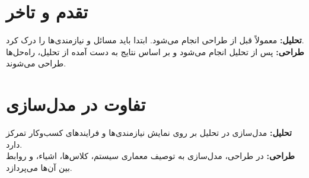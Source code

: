 \section*{تقدم و تاخر}
\textbf{تحلیل:} معمولاً قبل از طراحی انجام می‌شود. ابتدا باید مسائل و نیازمندی‌ها را درک کرد. \\
\textbf{طراحی:} پس از تحلیل انجام می‌شود و بر اساس نتایج به دست آمده از تحلیل، راه‌حل‌ها طراحی می‌شوند.

\section*{تفاوت در مدل‌سازی}
\textbf{تحلیل:} مدل‌سازی در تحلیل بر روی نمایش نیازمندی‌ها و فرایندهای کسب‌وکار تمرکز دارد. \\
\textbf{طراحی:} در طراحی، مدل‌سازی به توصیف معماری سیستم، کلاس‌ها، اشیاء، و روابط بین آن‌ها می‌پردازد.
